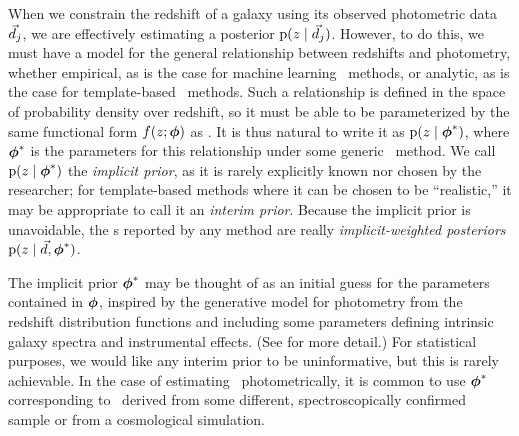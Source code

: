 When we constrain the redshift of a galaxy using its observed photometric data $\vec{d}_{j}$, we are effectively estimating a posterior $\mathrm{p}(z \mid \vec{d}_{j})$.
However, to do this, we must have a model for the general relationship between redshifts and photometry, whether empirical, as is the case for machine learning \pzpdf\ methods, or analytic, as is the case for template-based \pzpdf\ methods.
Such a relationship is defined in the space of probability density over redshift, so it must be able to be parameterized by the same functional form $f(z; {\boldsymbol{\phi}})$ as \nz .
It is thus natural to write it as $\mathrm{p}(z \mid {\ensuremath{\boldsymbol{\phi}}}^{*})$, where ${\boldsymbol{\phi}}^{*}$ is the parameters for this relationship under some generic \pzpdf\ method.
We call $\mathrm{p}(z \mid {\ensuremath{\boldsymbol{\phi}}}^{*})$ the \textit{implicit prior}, as it is rarely explicitly known nor chosen by the researcher; for template-based methods where it can be chosen to be ``realistic,'' it may be appropriate to call it an \textit{interim prior}.
Because the implicit prior is unavoidable, the \pzpdf s reported by any method are really \textit{implicit-weighted posteriors} $\mathrm{p}(z \mid \vec{d}, {\boldsymbol{\phi}}^{*})$.


The implicit prior ${\boldsymbol{\phi}}^{*}$ may be thought of as an initial guess for the parameters contained in ${\boldsymbol{\phi}}$, inspired by the generative model for photometry from the redshift distribution functions and including some parameters defining intrinsic galaxy spectra and instrumental effects. 
(See \citealt{Benitez2000} for more detail.)  
For statistical purposes, we would like any interim prior to be uninformative, but this is rarely achievable.  
In the case of estimating \nz\ photometrically, it is common to use ${\boldsymbol{\phi}}^{*}$ corresponding to \nz\ derived from some different, spectroscopically confirmed sample or from a cosmological simulation.

